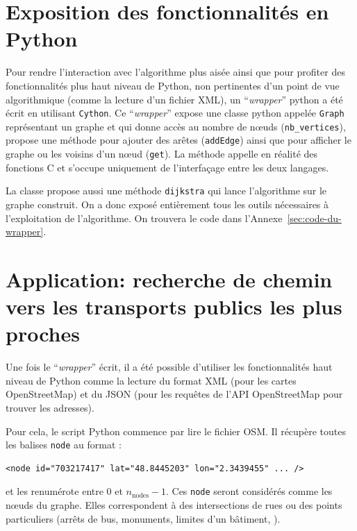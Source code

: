 \documentclass{article}
\begin{document}
\section{Exposition des fonctionnalités en
  Python}\label{sec:expos-des-fonct}
Pour rendre l'interaction avec l'algorithme plus aisée ainsi que pour
profiter des fonctionnalités plus haut niveau de Python, non
pertinentes d'un point de vue algorithmique (comme la lecture d'un
fichier XML), un ``\emph{wrapper}'' python a été écrit en utilisant
\texttt{Cython}. Ce ``\emph{wrapper}'' expose une classe python appelée \verb|Graph|
représentant un graphe et qui donne accès au nombre de nœuds
(\verb|nb_vertices|), propose une méthode pour ajouter des arêtes
(\verb|addEdge|) ainsi que pour afficher le graphe ou les voisins d'un
nœud (\verb|get|). La méthode appelle en réalité des fonctions C et
s'occupe uniquement de l'interfaçage entre les deux langages.

La classe propose aussi une méthode \verb|dijkstra| qui lance
l'algorithme sur le graphe construit. On a donc exposé entièrement
tous les outils nécessaires à l'exploitation de l'algorithme. On
trouvera le code dans l'Annexe~\ref{sec:code-du-wrapper}.
\section{Application: recherche de chemin vers les transports publics
  les plus proches}\label{sec:appl-rech-de}
  Une fois le ``\emph{wrapper}'' écrit, il a été possible d'utiliser les
fonctionnalités haut niveau de Python comme la lecture du format XML
(pour les cartes OpenStreetMap) et du JSON (pour les requêtes de l'API
OpenStreetMap pour trouver les adresses).

Pour cela, le script Python commence par lire le fichier OSM. Il
récupère toutes les balises \verb|node| au format :
\begin{verbatim}
<node id="703217417" lat="48.8445203" lon="2.3439455" ... />
\end{verbatim}
et les renumérote entre $0$ et $n_\mathrm{nodes}-1$. Ces \verb|node|
seront considérés comme les nœuds du graphe. Elles correspondent à des
intersections de rues ou des points particuliers (arrêts de bus,
monuments, limites d'un bâtiment, ).
\end{document}
